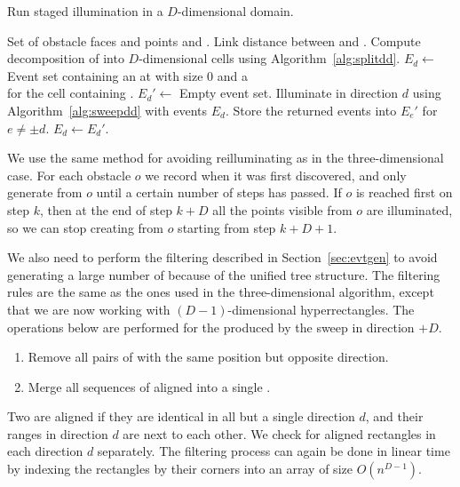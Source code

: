 \documentclass[english,gradu]{tktltiki2018}
\begin{document}
\begin{algorithm}
\caption{Run staged illumination in a $D$-dimensional domain.}
\label{alg:minlinkdd}
\begin{algorithmic}
\Require Set of obstacle faces and points \spt and \ept.
\Output Link distance between \spt and \ept.
\State Compute decomposition of \fspace into $D$-dimensional cells using Algorithm~\ref{alg:splitdd}.
	\State $E_d\gets$ Event set containing an \addE at \spt with size 0 and a \\
		\hspace{16mm} \cellE for the cell containing \spt.
\EndFor
{}
		\State $E_d'\gets$ Empty event set.
	\EndFor
		\State Illuminate in direction $d$ using Algorithm~\ref{alg:sweepdd} with events $E_d$.
		\State Store the returned events into $E_e'$ for $e\neq\pm d$.
	\EndFor
		\State $E_d\gets E_d'$.
	\EndFor
\EndWhile
\end{algorithmic}
\end{algorithm}

We use the same method for avoiding reilluminating as in the three-dimensional case.
For each obstacle $o$ we record when it was first discovered, and only generate \addEs from $o$ until a certain number of steps has passed.
If $o$ is reached first on step $k$, then at the end of step $k+D$ all the points visible from $o$ are illuminated, so we can stop creating \addEs from $o$ starting from step $k+D+1$.

We also need to perform the filtering described in Section~\ref{sec:evtgen} to avoid generating a large number of \addEs because of the unified tree structure.
The filtering rules are the same as the ones used in the three-dimensional algorithm, except that we are now working with $(D-1)$-dimensional hyperrectangles.
The operations below are performed for the \addEs produced by the sweep in direction $+D$.
\begin{enumerate}
\item Remove all pairs of \addEs with the same position but opposite direction.
\item Merge all sequences of aligned \addEs into a single \addE.
\end{enumerate}

Two \addEs are aligned if they are identical in all but a single direction $d$, and their ranges in direction $d$ are next to each other.
We check for aligned rectangles in each direction $d$ separately.
The filtering process can again be done in linear time by indexing the rectangles by their corners into an array of size $O(n^{D-1})$.
\end{document}

